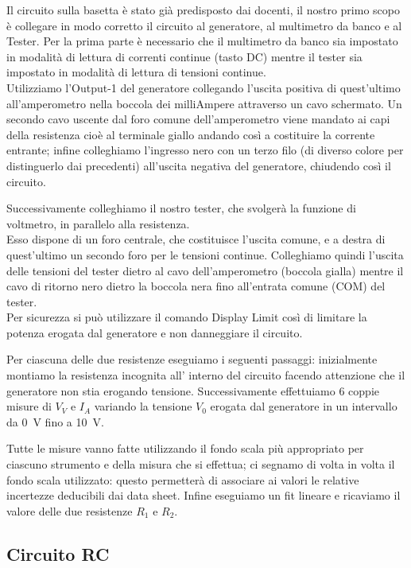 \documentclass[italian, a4paper, 10pt, twocolumn]{../../style/lab_unige}
\begin{document}
    Il circuito sulla basetta è stato già predisposto dai docenti, il nostro primo scopo è collegare in modo corretto il circuito al generatore, al  multimetro da banco e al Tester.
    Per la prima parte è necessario che il multimetro da banco sia impostato in modalità di lettura di correnti continue (tasto DC) mentre il tester sia impostato in modalità di lettura di tensioni continue.\\
    Utilizziamo l’Output-1 del generatore collegando l’uscita positiva di quest’ultimo  all’amperometro nella boccola dei milliAmpere attraverso un cavo schermato. Un secondo cavo uscente dal foro comune dell’amperometro viene mandato ai capi della resistenza cioè al terminale giallo andando così a costituire la corrente entrante; infine colleghiamo l’ingresso nero con un terzo filo (di diverso colore per distinguerlo dai precedenti) all’uscita negativa del generatore, chiudendo così il circuito.

    Successivamente colleghiamo il nostro tester, che svolgerà la funzione di voltmetro, in parallelo alla resistenza.\\
    Esso dispone di un foro centrale, che costituisce l’uscita comune, e a destra di quest’ultimo un secondo foro per le tensioni continue. Colleghiamo quindi l’uscita delle tensioni del tester dietro al cavo dell’amperometro (boccola gialla) mentre il cavo di ritorno nero dietro la boccola nera fino all'entrata comune (COM) del tester.\\
    Per sicurezza si può utilizzare il comando Display Limit così di limitare la potenza erogata dal generatore e non danneggiare il circuito.

    Per ciascuna delle due resistenze eseguiamo i seguenti passaggi: inizialmente montiamo la resistenza incognita  all’ interno del circuito facendo attenzione che il generatore non stia erogando tensione. Successivamente effettuiamo 6  coppie misure di $V_V$ e $I_A$ variando la tensione $V_0$ erogata dal generatore in un intervallo da 0~V fino a 10~V.  

    Tutte le misure vanno fatte utilizzando il fondo scala più appropriato per ciascuno strumento e della misura che si effettua; ci segnamo di volta in volta il fondo scala utilizzato: questo permetterà di associare ai valori le relative incertezze deducibili dai data sheet. Infine eseguiamo un fit lineare e ricaviamo il valore delle due resistenze $R_1$ e $R_2$.

    \subsection{Circuito RC}
\end{document}
